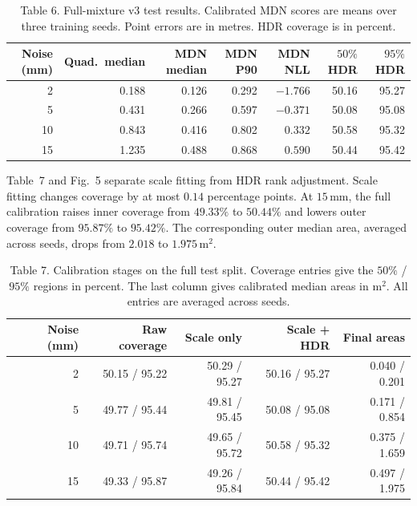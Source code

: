 \begin{table}[htbp]
  
  
  \caption{Table 6. Full-mixture v3 test results. Calibrated MDN scores are means over three training seeds. Point errors are in metres. HDR coverage is in percent.}
  \begin{tabular}{rrrrrrr}
    \toprule
    Noise (mm) & Quad.\ median & MDN median & MDN P90 & MDN NLL & $50\%$ HDR & $95\%$ HDR \\
    \midrule
    2  & 0.188 & 0.126 & 0.292 & $-1.766$ & 50.16 & 95.27 \\
    5  & 0.431 & 0.266 & 0.597 & $-0.371$ & 50.08 & 95.08 \\
    10 & 0.843 & 0.416 & 0.802 & $ 0.332$ & 50.58 & 95.32 \\
    15 & 1.235 & 0.488 & 0.868 & $ 0.590$ & 50.44 & 95.42 \\
    \bottomrule
  \end{tabular}
\end{table}

Table~7 and Fig.~5 separate scale fitting from HDR rank adjustment. Scale fitting changes coverage by at most $0.14$ percentage points. At $15\,\mathrm{mm}$, the full calibration raises inner coverage from $49.33\%$ to $50.44\%$ and lowers outer coverage from $95.87\%$ to $95.42\%$. The corresponding outer median area, averaged across seeds, drops from $2.018$ to $1.975\,\mathrm{m^2}$.

\begin{table}[htbp]
  
  
  \caption{Table 7. Calibration stages on the full test split. Coverage entries give the $50\%$ / $95\%$ regions in percent. The last column gives calibrated median areas in $\mathrm{m^2}$. All entries are averaged across seeds.}
  \begin{tabular}{rrrrr}
    \toprule
    Noise (mm) & Raw coverage & Scale only & Scale + HDR & Final areas \\
    \midrule
    2 & 50.15 / 95.22 & 50.29 / 95.27 & 50.16 / 95.27 & 0.040 / 0.201 \\
    5 & 49.77 / 95.44 & 49.81 / 95.45 & 50.08 / 95.08 & 0.171 / 0.854 \\
    10 & 49.71 / 95.74 & 49.65 / 95.72 & 50.58 / 95.32 & 0.375 / 1.659 \\
    15 & 49.33 / 95.87 & 49.26 / 95.84 & 50.44 / 95.42 & 0.497 / 1.975 \\
    \bottomrule
  \end{tabular}
\end{table}

